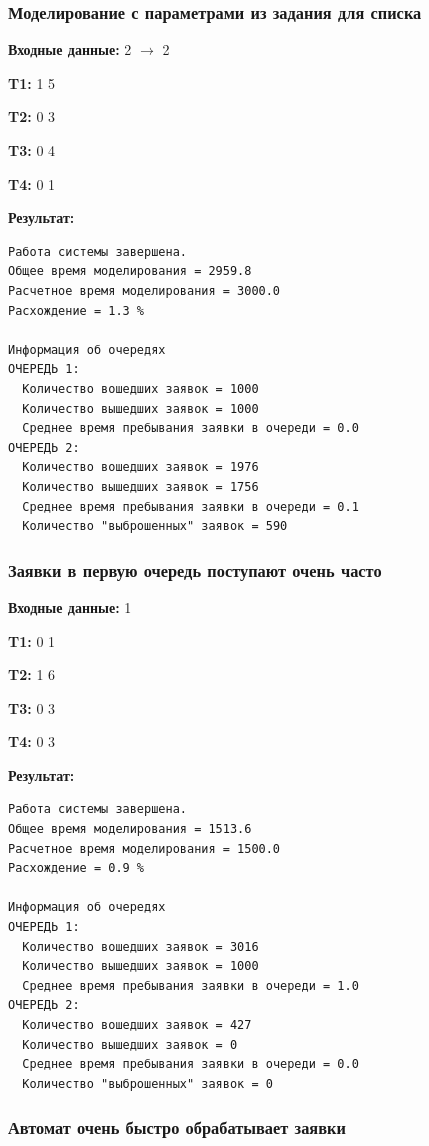 \documentclass[a4paper,12pt]{extarticle}
\begin{document}
\newpage

\subsubsection{Моделирование с параметрами из задания для списка}

\textbf{Входные данные: }
2 $\rightarrow$ 2

\textbf{T1: }
1 5

\textbf{T2: }
0 3

\textbf{T3: }
0 4

\textbf{T4: }
0 1


\textbf{Результат: }
\begin{verbatim}
Работа системы завершена.
Общее время моделирования = 2959.8
Расчетное время моделирования = 3000.0
Расхождение = 1.3 %

Информация об очередях
ОЧЕРЕДЬ 1:
  Количество вошедших заявок = 1000
  Количество вышедших заявок = 1000
  Среднее время пребывания заявки в очереди = 0.0
ОЧЕРЕДЬ 2:
  Количество вошедших заявок = 1976
  Количество вышедших заявок = 1756
  Среднее время пребывания заявки в очереди = 0.1
  Количество "выброшенных" заявок = 590
\end{verbatim}

\subsubsection{Заявки в первую очередь поступают очень часто}

\textbf{Входные данные: }
1

\textbf{T1: }
0 1

\textbf{T2: }
1 6

\textbf{T3: }
0 3

\textbf{T4: }
0 3


\textbf{Результат: }
\begin{verbatim}
Работа системы завершена.
Общее время моделирования = 1513.6
Расчетное время моделирования = 1500.0
Расхождение = 0.9 %

Информация об очередях
ОЧЕРЕДЬ 1:
  Количество вошедших заявок = 3016
  Количество вышедших заявок = 1000
  Среднее время пребывания заявки в очереди = 1.0
ОЧЕРЕДЬ 2:
  Количество вошедших заявок = 427
  Количество вышедших заявок = 0
  Среднее время пребывания заявки в очереди = 0.0
  Количество "выброшенных" заявок = 0
\end{verbatim}

\subsubsection{Автомат очень быстро обрабатывает заявки}
\end{document}
